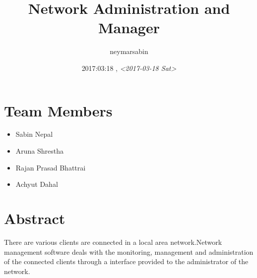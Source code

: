 \documentclass[10pt,article,oneside]{memoir}
\author{neymarsabin}
\date{2017:03:18 , \textit{<2017-03-18 Sat>}}
\title{Network Administration and Manager}
\begin{document}
\maketitle
\tableofcontents



\chapter*{Team Members}
\label{sec:org1490b1d}
\begin{itemize}
\item Sabin Nepal
\item Aruna Shrestha
\item Rajan Prasad Bhattrai
\item Achyut Dahal
\end{itemize}


\chapter*{Abstract}
\label{sec:orge762763}
There are various clients are connected in a local area network.Network management software deals with the monitoring,
management and administration of the connected clients through a interface provided to the administrator of the 
network.
\end{document}
